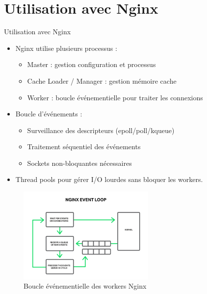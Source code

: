 \documentclass[aspectratio=43,8pt]{beamer}
\begin{document}
\section{Utilisation avec Nginx}
\begin{frame}{Utilisation avec Nginx}
\begin{itemize}
    \item Nginx utilise plusieurs processus :
    \begin{itemize}
        \item Master : gestion configuration et processus
        \item Cache Loader / Manager : gestion mémoire cache
        \item Worker : boucle événementielle pour traiter les connexions
    \end{itemize}
    \item Boucle d’événements :
    \begin{itemize}
        \item Surveillance des descripteurs (epoll/poll/kqueue)
        \item Traitement séquentiel des événements
        \item Sockets non-bloquantes nécessaires
    \end{itemize}
    \item Thread pools pour gérer I/O lourdes sans bloquer les workers.
\end{itemize}
\begin{figure}
    \centering
    \includegraphics[width=0.6\textwidth]{img2/nginx-event-Loop.png}
    \caption{Boucle événementielle des workers Nginx}
\end{figure}
\end{frame}
\end{document}
